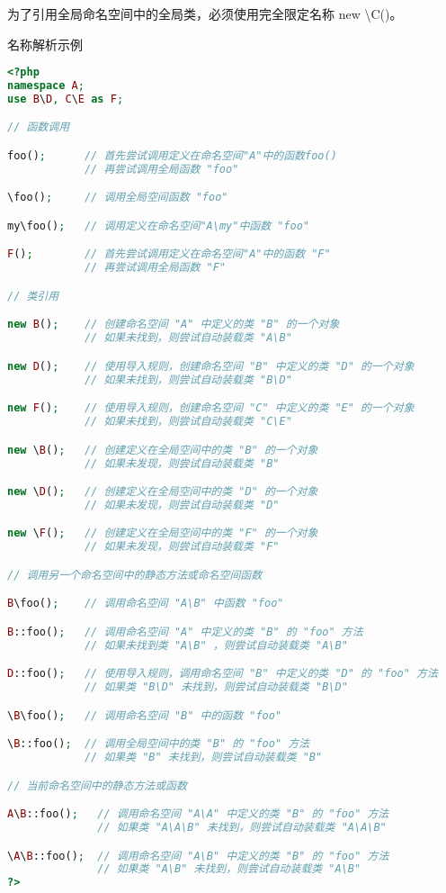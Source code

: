 为了引用全局命名空间中的全局类，必须使用完全限定名称 new \textbackslash C()。

\begin{example}
名称解析示例
\begin{lstlisting}[language=PHP]
<?php
namespace A;
use B\D, C\E as F;

// 函数调用

foo();      // 首先尝试调用定义在命名空间"A"中的函数foo()
            // 再尝试调用全局函数 "foo"

\foo();     // 调用全局空间函数 "foo" 

my\foo();   // 调用定义在命名空间"A\my"中函数 "foo" 

F();        // 首先尝试调用定义在命名空间"A"中的函数 "F" 
            // 再尝试调用全局函数 "F"

// 类引用

new B();    // 创建命名空间 "A" 中定义的类 "B" 的一个对象
            // 如果未找到，则尝试自动装载类 "A\B"

new D();    // 使用导入规则，创建命名空间 "B" 中定义的类 "D" 的一个对象
            // 如果未找到，则尝试自动装载类 "B\D"

new F();    // 使用导入规则，创建命名空间 "C" 中定义的类 "E" 的一个对象
            // 如果未找到，则尝试自动装载类 "C\E"

new \B();   // 创建定义在全局空间中的类 "B" 的一个对象
            // 如果未发现，则尝试自动装载类 "B"

new \D();   // 创建定义在全局空间中的类 "D" 的一个对象
            // 如果未发现，则尝试自动装载类 "D"

new \F();   // 创建定义在全局空间中的类 "F" 的一个对象
            // 如果未发现，则尝试自动装载类 "F"

// 调用另一个命名空间中的静态方法或命名空间函数

B\foo();    // 调用命名空间 "A\B" 中函数 "foo"

B::foo();   // 调用命名空间 "A" 中定义的类 "B" 的 "foo" 方法
            // 如果未找到类 "A\B" ，则尝试自动装载类 "A\B"

D::foo();   // 使用导入规则，调用命名空间 "B" 中定义的类 "D" 的 "foo" 方法
            // 如果类 "B\D" 未找到，则尝试自动装载类 "B\D"

\B\foo();   // 调用命名空间 "B" 中的函数 "foo" 

\B::foo();  // 调用全局空间中的类 "B" 的 "foo" 方法
            // 如果类 "B" 未找到，则尝试自动装载类 "B"

// 当前命名空间中的静态方法或函数

A\B::foo();   // 调用命名空间 "A\A" 中定义的类 "B" 的 "foo" 方法
              // 如果类 "A\A\B" 未找到，则尝试自动装载类 "A\A\B"

\A\B::foo();  // 调用命名空间 "A\B" 中定义的类 "B" 的 "foo" 方法
              // 如果类 "A\B" 未找到，则尝试自动装载类 "A\B"
?>
\end{lstlisting}
\end{example}






\clearpage